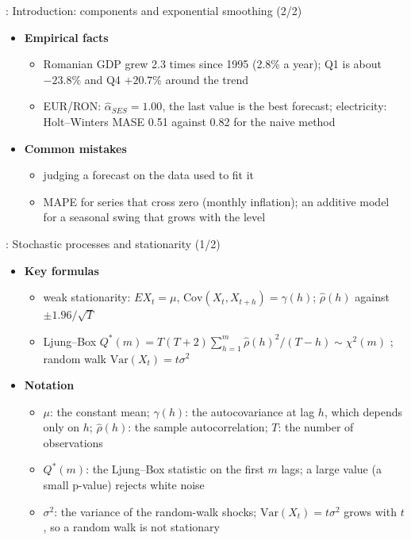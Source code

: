 \begin{frame}{: Introduction: components and exponential smoothing (2/2)}
\itemsize{\footnotesize}
\begin{itemize}
    \item \textbf{Empirical facts}
    \begin{itemize}
        \item Romanian GDP grew 2.3 times since 1995 (2.8\% a year); Q1 is about $\ensuremath{-}23.8\%$ and Q4 $+20.7\%$ around the trend
        \item EUR/RON: $\hat\alpha_{SES} = 1.00$, the last value is the best forecast; electricity: Holt--Winters MASE 0.51 against 0.82 for the naive method
    \end{itemize}
    \item \textbf{Common mistakes}
    \begin{itemize}
        \item judging a forecast on the data used to fit it
        \item MAPE for series that cross zero (monthly inflation); an additive model for a seasonal swing that grows with the level
    \end{itemize}
\end{itemize}
\end{frame}

\begin{frame}{: Stochastic processes and stationarity (1/2)}
\itemsize{\footnotesize}
\begin{itemize}
    \item \textbf{Key formulas}
    \begin{itemize}
        \item weak stationarity: $E X_t = \mu$, $\mathrm{Cov}(X_t, X_{t+h}) = \gamma(h)$; $\hat\rho(h)$ against $\pm 1.96/\sqrt{T}$
        \item Ljung--Box $Q^*(m) = T(T + 2)\sum_{h=1}^{m}\hat\rho(h)^2/(T - h) \sim \chi^2(m)$ ; random walk $\mathrm{Var}(X_t) = t\sigma^2$
    \end{itemize}
    \item \textbf{Notation}
    \begin{itemize}
        \item $\mu$: the constant mean; $\gamma(h)$: the autocovariance at lag $h$, which depends only on $h$; $\hat\rho(h)$: the sample autocorrelation; $T$: the number of observations
        \item $Q^*(m)$: the Ljung--Box statistic on the first $m$ lags; a large value (a small p-value) rejects white noise
        \item $\sigma^2$: the variance of the random-walk shocks; $\mathrm{Var}(X_t) = t\sigma^2$ grows with $t$, so a random walk is not stationary
    \end{itemize}
\end{itemize}
\end{frame}

